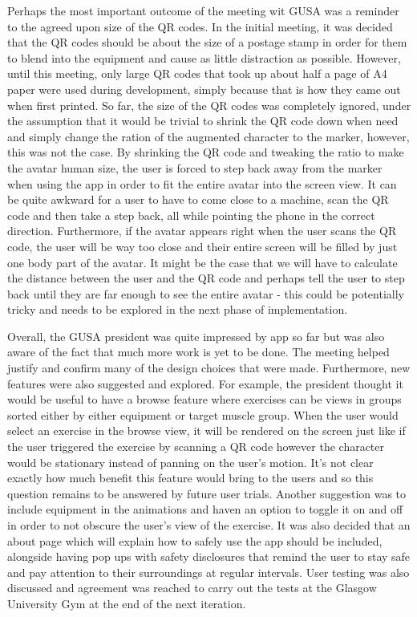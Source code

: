 \documentclass{l4proj}
\begin{document}
Perhaps the most important outcome of the meeting wit GUSA was a reminder to the agreed upon size of the QR codes. In the initial meeting, it was decided that the QR codes should be about the size of a postage stamp in order for them to blend into the equipment and cause as little distraction as possible. However, until this meeting, only large QR codes that took up about half a page of A4 paper were used during development, simply because that is how they came out when first printed. So far, the size of the QR codes was completely ignored, under the assumption that it would be trivial to shrink the QR code down when need and simply change the ration of the augmented character to the marker, however, this was not the case. By shrinking the QR code and tweaking the ratio to make the avatar human size, the user is forced to step back away from the marker when using the app in order to fit the entire avatar into the screen view. It can be quite awkward for a user to have to come close to a machine, scan the QR code and then take a step back, all while pointing the phone in the correct direction. Furthermore, if the avatar appears right when the user scans the QR code, the user will be way too close and their entire screen will be filled by just one body part of the avatar. It might be the case that we will have to calculate the distance between the user and the QR code and perhaps tell the user to step back until they are far enough to see the entire avatar - this could be potentially tricky and needs to be explored in the next phase of implementation. 

Overall, the GUSA president was quite impressed by app so far but was also aware of the fact that much more work is yet to be done. The meeting helped justify and confirm many of the design choices that were made. Furthermore, new features were also suggested and explored. For example, the president thought it would be useful to have a browse feature where exercises can be views in groups sorted either by either equipment or target muscle group. When the user would select an exercise in the browse view, it will be rendered on the screen just like if the user triggered the exercise by scanning a QR code however the character would be stationary instead of panning on the user's motion. It's not clear exactly how much benefit this feature would bring to the users and so this question remains to be answered by future user trials. Another suggestion was to include equipment in the animations and haven an option to toggle it on and off in order to not obscure the user's view of the exercise. It was also decided that an about page which will explain how to safely use the app should be included, alongside having pop ups with safety disclosures that remind the user to stay safe and pay attention to their surroundings at regular intervals. User testing was also discussed and agreement was reached to carry out the tests at the Glasgow University Gym at the end of the next iteration.
\end{document}
